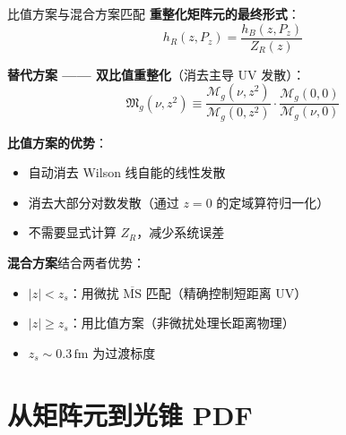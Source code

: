 \documentclass[10pt,aspectratio=169]{beamer}
\newcommand{\msbar}{\overline{\mathrm{MS}}}
\newcommand{\fm}{\,\mathrm{fm}}
\newcommand{\Pz}{P_z}
\begin{document}
\begin{frame}{比值方案与混合方案匹配}
\small
\textbf{重整化矩阵元的最终形式}：
\begin{equation}
  h_R(z, \Pz) = \frac{h_B(z, \Pz)}{Z_R(z)}
\end{equation}

\textbf{替代方案 —— 双比值重整化}（消去主导 UV 发散）：
\begin{equation}
  \mathfrak{M}_g(\nu, z^2) \equiv
  \frac{\mathcal{M}_g(\nu, z^2)}{\mathcal{M}_g(0, z^2)}
  \cdot \frac{\mathcal{M}_g(0, 0)}{\mathcal{M}_g(\nu, 0)}
\end{equation}

\textbf{比值方案的优势}：
\begin{itemize}
  \item 自动消去 Wilson 线自能的线性发散
  \item 消去大部分对数发散（通过 $z=0$ 的定域算符归一化）
  \item 不需要显式计算 $Z_R$，减少系统误差
\end{itemize}

\textbf{混合方案}结合两者优势：
\begin{itemize}
  \item $|z| < z_s$：用微扰 $\msbar$ 匹配（精确控制短距离 UV）
  \item $|z| \ge z_s$：用比值方案（非微扰处理长距离物理）
  \item $z_s \sim 0.3\fm$ 为过渡标度
\end{itemize}
\end{frame}

\section{从矩阵元到光锥 PDF}
\end{document}
